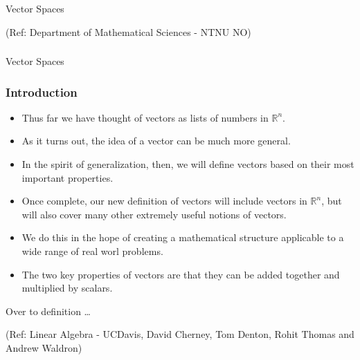  \begin{frame}[fragile]\frametitle{}
\begin{center}
{\Large Vector Spaces}

\tiny{(Ref: Department of Mathematical Sciences - NTNU NO)}

\end{center}
\end{frame}

\newtheorem*{remark}{Remark}
\newcommand{\dotprod}{ \cdot }

\newcommand{\colvec}[1]{\ensuremath{\begin{pmatrix}#1\end{pmatrix}}}




\begin{frame}[fragile]\frametitle{}
\begin{center}
{\Large Vector Spaces }
\end{center}
\end{frame}

\begin{frame}[fragile]
\frametitle{Introduction}
\begin{itemize}
\item Thus far we have thought of vectors as lists of numbers in $\mathbb{R}^n$.  
\item As it turns out, the idea of a vector can be much more general.  
\item In the spirit of generalization, then, we will define vectors based on their most important properties.  
\item Once complete, our new definition of vectors will include vectors in $\mathbb{R}^n$, but will also cover many other extremely useful notions of vectors. 
\item We do this in the hope of creating a mathematical structure
applicable to a wide range of real worl problems.
\item The two key properties of vectors are that they can be added together and multiplied by scalars.  
\end{itemize}

Over to definition \ldots

\tiny{(Ref: Linear Algebra - UCDavis, David Cherney, Tom Denton, Rohit Thomas and Andrew Waldron)}


\end{frame}

